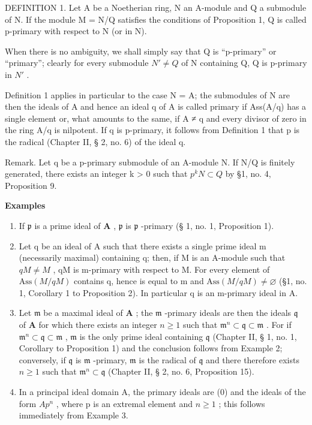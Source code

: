 DEFINITION 1. Let A be a Noetherian ring, N an A-module and Q a submodule of N. If the module M = N/Q satisfies the conditions of Proposition 1, Q is called p-primary with respect to N (or in N).

When there is no ambiguity, we shall simply say that Q is ``p-primary'' or ``primary''; clearly for every submodule \(N' \neq Q\) of N containing Q, Q is p-primary in \(N'\) .

Definition 1 applies in particular to the case N = A; the submodules of N are then the ideals of A and hence an ideal q of A is called primary if Ass(A/q) has a single element or, what amounts to the same, if A ≠ q and every divisor of zero in the ring A/q is nilpotent. If q is p-primary, it follows from Definition 1 that p is the radical (Chapter II, § 2, no. 6) of the ideal q.

Remark. Let q be a p-primary submodule of an A-module N. If N/Q is finitely generated, there exists an integer k \textgreater{} 0 such that \(p^{k}N \subset Q\) by §1, no. 4, Proposition 9.

\textbf{Examples}\par

\begin{enumerate}
\def\labelenumi{(\arabic{enumi})}
\item
  If \(\mathfrak{p}\) is a prime ideal of \(\mathbf{A}\) , \(\mathfrak{p}\) is \(\mathfrak{p}\) -primary (§ 1, no. 1, Proposition 1).
\item
  Let q be an ideal of A such that there exists a single prime ideal m (necessarily maximal) containing q; then, if M is an A-module such that \(qM \neq M\) , qM is m-primary with respect to M. For every element of \(\text{Ass}(M/qM)\) contains q, hence is equal to m and \(\text{Ass}(M/qM) \neq \varnothing\) (§1, no. 1, Corollary 1 to Proposition 2). In particular q is an m-primary ideal in A.
\item
  Let \(\mathfrak{m}\) be a maximal ideal of \(\mathbf{A}\) ; the \(\mathfrak{m}\) -primary ideals are then the ideals \(\mathfrak{q}\) of \(\mathbf{A}\) for which there exists an integer \(n \geqslant 1\) such that \(\mathfrak{m}^n \subset \mathfrak{q} \subset \mathfrak{m}\) . For if \(\mathfrak{m}^n \subset \mathfrak{q} \subset \mathfrak{m}\) , \(\mathfrak{m}\) is the only prime ideal containing \(\mathfrak{q}\) (Chapter II, § 1, no. 1, Corollary to Proposition 1) and the conclusion follows from Example 2; conversely, if \(\mathfrak{q}\) is \(\mathfrak{m}\) -primary, \(\mathfrak{m}\) is the radical of \(\mathfrak{q}\) and there therefore exists \(n \geqslant 1\) such that \(\mathfrak{m}^n \subset \mathfrak{q}\) (Chapter II, § 2, no. 6, Proposition 15).
\item
  In a principal ideal domain A, the primary ideals are (0) and the ideals of the form \(Ap^{n}\) , where p is an extremal element and \(n \geqslant 1\) ; this follows immediately from Example 3.
\end{enumerate}

